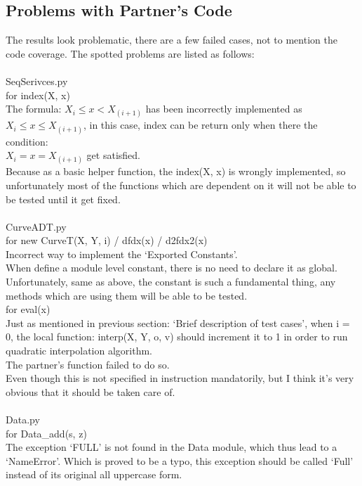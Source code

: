 \documentclass[12pt]{article}
\begin{document}
\subsection{Problems with Partner's Code}
The results look problematic, there are a few failed cases, not to mention the code coverage. The spotted problems are listed as follows:\\
\\
\large SeqSerivces.py\\
\normalsize for index(X, x)\\
The formula: $X_i\leq x < X_(i+1)$ has been incorrectly implemented as $X_i \leq x \leq X_{(i+1)}$, in this case, index can be return only when there the condition:\\ $X_i=x=X_{(i+1)}$ get satisfied.\\
Because as a basic helper function, the index(X, x) is wrongly implemented, so unfortunately most of the functions which are dependent on it will not be able to be tested until it get fixed.\\
\\
\large CurveADT.py\\
\normalsize for new CurveT(X, Y, i) / dfdx(x) / d2fdx2(x)\\
Incorrect way to implement the ‘Exported Constants’.\\
When define a module level constant, there is no need to declare it as global.\\
Unfortunately, same as above, the constant is such a fundamental thing, any methods which are using them will be able to be tested.\\
for eval(x)\\
Just as mentioned in previous section: ‘Brief description of test cases’, when i = 0, the local function: interp(X, Y, o, v) should increment it to 1 in order to run quadratic interpolation algorithm. \\
The partner’s function failed to do so.\\
Even though this is not specified in instruction mandatorily, but I think it’s very obvious that it should be taken care of.\\
\\
\large Data.py\\
\normalsize for Data\_add(s, z)\\
The exception ‘FULL’ is not found in the Data module, which thus lead to a ‘NameError’. Which is proved to be a typo, this exception should be called ‘Full’ instead of its original all uppercase form.\\
\end{document}
